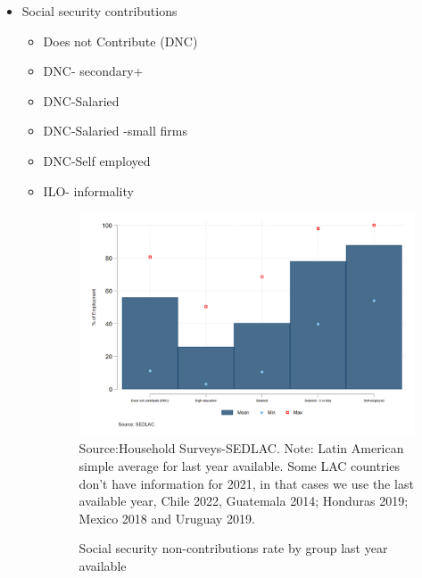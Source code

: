 \documentclass[english]{article}
\begin{document}
\begin{itemize}
 \item Social security contributions
    \begin{itemize}
        \item Does not Contribute (DNC) 
        \item DNC- secondary+
        \item DNC-Salaried
        \item DNC-Salaried -small firms
        \item DNC-Self employed
        \item ILO- informality
        \begin{figure}[!htb]
        \centering
        \caption{Social security non-contributions rate by group last year available}     
        \includegraphics[scale=.3]{latex/figures/Snapshot/Social security contributions.png}
        \label{fig:SScontributions}
        \footnotesize{Source:Household Surveys-SEDLAC.}
        \footnotesize{Note: Latin American simple average for last year available. Some LAC countries don’t have information for 2021, in that cases we use the last available year, Chile 2022, Guatemala 2014; Honduras 2019; Mexico 2018 and Uruguay 2019.}
        \end{figure}
        
    \end{itemize}



\end{itemize}
\end{document}
